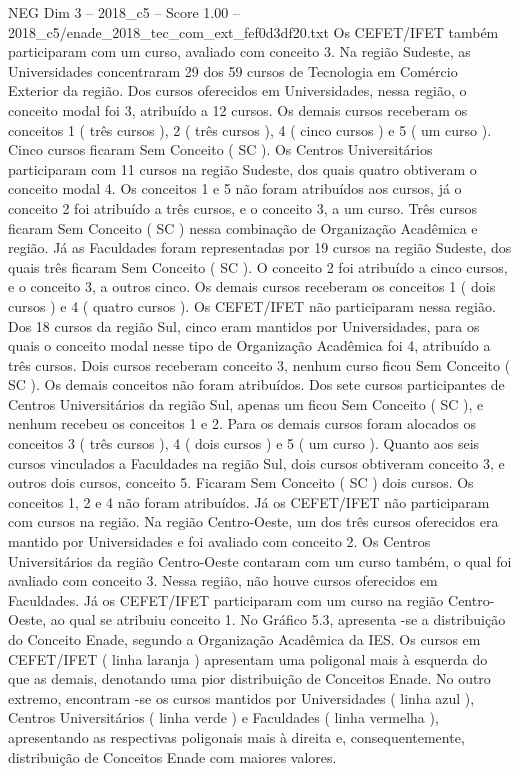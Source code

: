 \begin{textsample}{NEG Dim 3 – 2018\_c5 – Score 1.00 – 2018\_c5/enade\_2018\_tec\_com\_ext\_fef0d3df20.txt}
Os CEFET/IFET também participaram com um curso, avaliado com conceito 3.
Na região Sudeste, as Universidades concentraram 29 dos 59 cursos de Tecnologia em Comércio Exterior da região.
Dos cursos oferecidos em Universidades, nessa região, o conceito modal foi 3, atribuído a 12 cursos.
Os demais cursos receberam os conceitos 1 ( três cursos ), 2 ( três cursos ), 4 ( cinco cursos ) e 5 ( um curso ).
Cinco cursos ficaram Sem Conceito ( SC ).
Os Centros Universitários participaram com 11 cursos na região Sudeste, dos quais quatro obtiveram o conceito modal 4.
Os conceitos 1 e 5 não foram atribuídos aos cursos, já o conceito 2 foi atribuído a três cursos, e o conceito 3, a um curso.
Três cursos ficaram Sem Conceito ( SC ) nessa combinação de Organização Acadêmica e região.
Já as Faculdades foram representadas por 19 cursos na região Sudeste, dos quais três ficaram Sem Conceito ( SC ).
O conceito 2 foi atribuído a cinco cursos, e o conceito 3, a outros cinco.
Os demais cursos receberam os conceitos 1 ( dois cursos ) e 4 ( quatro cursos ).
Os CEFET/IFET não participaram nessa região.
Dos 18 cursos da região Sul, cinco eram mantidos por Universidades, para os quais o conceito modal nesse tipo de Organização Acadêmica foi 4, atribuído a três cursos.
Dois cursos receberam conceito 3, nenhum curso ficou Sem Conceito ( SC ).
Os demais conceitos não foram atribuídos.
Dos sete cursos participantes de Centros Universitários da região Sul, apenas um ficou Sem Conceito ( SC ), e nenhum recebeu os conceitos 1 e 2.
Para os demais cursos foram alocados os conceitos 3 ( três cursos ), 4 ( dois cursos ) e 5 ( um curso ).
Quanto aos seis cursos vinculados a Faculdades na região Sul, dois cursos obtiveram conceito 3, e outros dois cursos, conceito 5.
Ficaram Sem Conceito ( SC ) dois cursos.
Os conceitos 1, 2 e 4 não foram atribuídos.
Já os CEFET/IFET não participaram com cursos na região.
Na região Centro-Oeste, um dos três cursos oferecidos era mantido por Universidades e foi avaliado com conceito 2.
Os Centros Universitários da região Centro-Oeste contaram com um curso também, o qual foi avaliado com conceito 3.
Nessa região, não houve cursos oferecidos em Faculdades.
Já os CEFET/IFET participaram com um curso na região Centro-Oeste, ao qual se atribuiu conceito 1.
No Gráfico 5.3, apresenta -se a distribuição do Conceito Enade, segundo a Organização Acadêmica da IES.
Os cursos em CEFET/IFET ( linha laranja ) apresentam uma poligonal mais à esquerda do que as demais, denotando uma pior distribuição de Conceitos Enade.
No outro extremo, encontram -se os cursos mantidos por Universidades ( linha azul ), Centros Universitários ( linha verde ) e Faculdades ( linha vermelha ), apresentando as respectivas poligonais mais à direita e, consequentemente, distribuição de Conceitos Enade com maiores valores.

\end{textsample}
